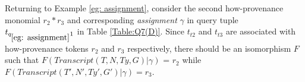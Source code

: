 Returning to Example \ref{eg: assignment}, consider the second how-provenance monomial $r_2*r_3$ and corresponding {\em assignment} $\gamma$ in query tuple $t_{q_{\ref{eg: assignment}}1}$ in Table \ref{Table:Q7(D)}. Since $t_{t2}$ and $t_{t3}$ are associated with how-provenance tokens $r_2$ and $r_3$ respectively, there should be an isomorphism $F$ such that $F(Transcript(T, N, Ty, G)|\gamma)$ = $r_2$ while $F(Transcript(T', N', Ty', G')|\gamma) = r_3$.









